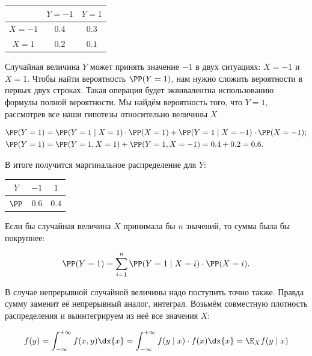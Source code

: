 \documentclass[12pt, a4paper, oneside]{article}
\begin{document}
\begin{center}
\begin{tabular}{c|c|c}
       &  $Y = -1$    &  $Y = 1$   \\ \hline
$X = -1$   & $0.4$    &  $0.3$ \\ \hline
$X = 1$    & $0.2$    &  $0.1$ \\
\end{tabular}
\end{center}

Случайная величина $Y$ может принять значение $-1$ в двух ситуациях: $X=-1$ и $X=1$. Чтобы найти вероятность $\PP(Y=1)$, нам нужно сложить вероятности в первых двух строках. Такая операция будет эквивалентна использованию формулы полной вероятности. Мы найдём вероятность того, что $Y=1$, рассмотрев все наши гипотезы относительно величины $X$

\begin{equation*}
\begin{aligned}
 \PP(Y=1) &= \PP(Y=1 \mid X=1) \cdot \PP(X=1) + \PP(Y=1 \mid X = -1) \cdot \PP(X = -1);\\
  \PP(Y=1) &=   \PP(Y=1, X=1) + \PP(Y=1,X=-1) = 0.4 + 0.2 = 0.6.
  \end{aligned}
 \end{equation*}

 В итоге получится маргинальное распределение для $Y$: 

\begin{center}
\begin{tabular}{c|c|c}
$Y $ &  $-1$    &  $1$     \\ \hline
$\PP$&  	$0.6$   &  $0.4$   \\
\end{tabular}
\end{center}

Если бы случайная величина $X$ принимала бы $n$ значений, то сумма была бы покрупнее: 

\[
\PP(Y=1) = \sum_{i=1}^n \PP(Y = 1 \mid X = i) \cdot \PP(X = i).
\]

В случае непрерывной случайной величины надо поступить точно также. Правда сумму заменит её непрерывный аналог, интеграл. Возьмём совместную плотность распределения и выинтегрируем из неё все значения $X$:

\begin{equation}\label{f3}
f(y) = \int_{-\infty}^{+\infty} f(x,y) \dx{x} = \int_{-\infty}^{+\infty} f(y \mid x) \cdot f(x) \dx{x} = \E_{X} f(y \mid x)
\end{equation}
\end{document}
